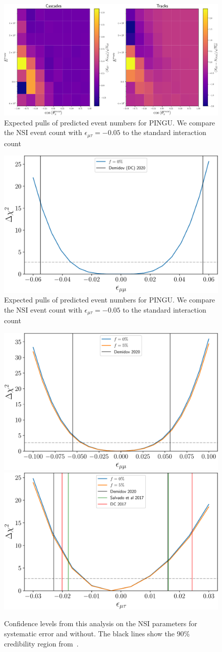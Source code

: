 \documentclass[draft=True]{revtex4-2}
\newcommand{\emt}{\ensuremath{\epsilon_{\mu\tau}}}
\begin{document}
 \begin{figure}[!tb]
    \begin{center}
       \includegraphics[width=0.7\linewidth]{figures/PINGU_event_pulls.pdf}
    \end{center}
    \caption{Expected pulls of predicted event numbers for PINGU. We compare the NSI event count with $\emt=-0.05$
    to the standard interaction count}\label{fig:PINGU_event_pulls}
 \end{figure}

 \begin{figure}[!tb]
    \begin{center}
       \includegraphics[width=0.4\linewidth]{figures/PINGU_emm.pdf}
    \end{center}
    \caption{Expected pulls of predicted event numbers for PINGU. We compare the NSI event count with $\emt=-0.05$
    to the standard interaction count}\label{fig:PINGU_chisq}
 \end{figure}

 \begin{figure}[!tb]
    \begin{center}
       \includegraphics[width=0.4\linewidth]{figures/DC_emm.pdf}
       \includegraphics[width=0.4\linewidth]{figures/DC_emt.pdf}
    \end{center}
    \caption{Confidence levels from this analysis on the NSI
    parameters for systematic error and without. The black lines show the 90\% credibility region from~\cite{demidov}.}\label{fig:DC_chisq}
 \end{figure}
\end{document}
